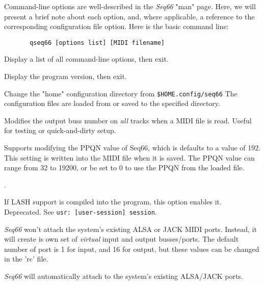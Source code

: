    Command-line options are well-described in the \textsl{Seq66} "man" page.
   Here, we will present a brief note about each option, and, where applicable, a
   reference to the corresponding configuration file option.
   Here is the basic command line:

   \begin{verbatim}
       qseq66 [options list] [MIDI filename]
   \end{verbatim}

      Display a list of all command-line options, then exit.

      Display the program version, then exit.

      Change the "home" configuration directory from \texttt{\$HOME.config/seq66}
      The configuration files are loaded from or saved to the specified directory.

      Modifies the output buss number on \textsl{all} tracks when a MIDI file is
      read.  Useful for testing or quick-and-dirty setup.

      Supports modifying the PPQN value of Seq66, which is
      defaults to a value of 192.  This setting
      is written into the MIDI file when it is saved.
      The PPQN value can range from 32 to 19200, or
      be set to 0 to use the PPQN from the loaded file.

      .

      If LASH support is compiled into the program, this option
      enables it.  Deprecated.
      See \texttt{usr: [user-session] session}.


      \textsl{Seq66} won't attach the system's existing ALSA or JACK MIDI ports.
      Instead, it will create is own set of \textsl{virtual}
      input and output busses/ports.  The default number of port is 1 for input,
      and 16 for output, but these values can be changed in the 'rc' file.


      \textsl{Seq66} will automatically attach to the system's existing
      ALSA/JACK ports.


